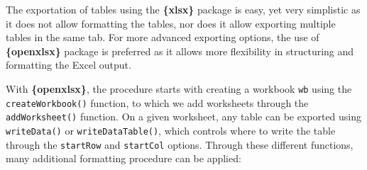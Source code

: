 \documentclass[
]{book}
\begin{document}
The exportation of tables using the \textbf{\{xlsx\}} package is easy, yet very simplistic as it does not allow formatting the tables, nor does it allow exporting multiple tables in the same tab. For more advanced exporting options, the use of \textbf{\{openxlsx\}} package is preferred as it allows more flexibility in structuring and formatting the Excel output.

With \textbf{\{openxlsx\}}, the procedure starts with creating a workbook \texttt{wb} using the \texttt{createWorkbook()} function, to which we add worksheets through the \texttt{addWorksheet()} function.
On a given worksheet, any table can be exported using \texttt{writeData()} or \texttt{writeDataTable()}, which controls where to write the table through the \texttt{startRow} and \texttt{startCol} options.
Through these different functions, many additional formatting procedure can be applied:
\end{document}
